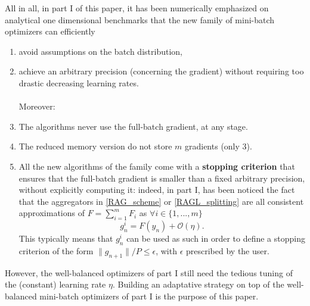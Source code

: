 All in all, in part I of this paper, it has been numerically emphasized on analytical one dimensional benchmarks that the new family of mini-batch optimizers can efficiently
\begin{enumerate}
	\item {avoid assumptions on the batch distribution}, 
	\item achieve an arbitrary precision (concerning the gradient) without requiring too drastic decreasing learning rates. \\ \ \\
          Moreover: \\
	\item The algorithms never use the full-batch gradient, at any stage. 
        \item The reduced memory version do not store $m$ gradients (only $3$). 
	\item All the new algorithms of the family come with a \textbf{stopping criterion} that ensures that the full-batch gradient is smaller than a fixed arbitrary
          precision, without explicitly computing it: indeed, in part I, has been noticed the fact that the aggregators in \eqref{RAG_scheme} or \eqref{RAGL_splitting} are all
          consistent approximations of $F=\sum_{i=1}^m F_i$ as 
$\forall i\in\{1,...,m\}$ 
  \begin{equation}
    \label{stopping_criterion}
    g_n^i = F(y_n) +\mathcal{O}(\eta). 
  \end{equation}
  This typically means that $g_n^i$ can be used as such in order to define a stopping criterion of the form $\|g_{n+1}\|/P \leq
  \epsilon$, with $\epsilon$ prescribed by the user. 
\end{enumerate}
However, the well-balanced optimizers of part I still need the tedious tuning of the (constant) learning rate $\eta$. 
Building an adaptative strategy on top of the well-balanced mini-batch
          optimizers of part I is the purpose of this paper. 

